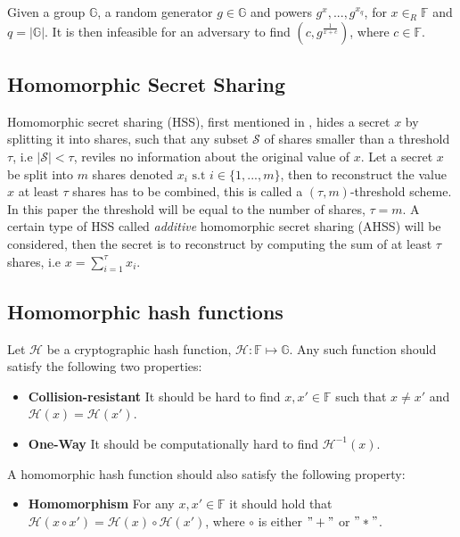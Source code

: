 \vspace{10pt}
\begin{Ass}
 Given a group $\mathds{G}$, a random generator $g\in \mathds{G}$ and powers $g^x,...,g^{x_q}$, for $x \in_R \mathds{F}$ and  $q= |\mathds{G}|$. It is then  infeasible for an adversary to find $(c, g^{\frac{1}{x+c}})$, where $c \in \mathds{F}$.
\end{Ass}




\subsection*{Homomorphic Secret Sharing}
Homomorphic secret sharing (HSS), first mentioned in \cite{How_share_A_secret}, hides a secret $x$ by splitting it into shares, such that any subset $\mathcal{S}$ of shares smaller than a threshold $\tau$, i.e $|\mathcal{S}|<\tau$, reviles no information about the original value of $x$.  Let a secret $x$ be split into $m$ shares denoted $x_i \text{ s.t } i\in\{1,...,m\}$, then to reconstruct the value $x$ at least $\tau$ shares has to be combined, this is called a $(\tau,m)$-threshold scheme. In this paper the threshold will be equal to the number of shares,  $\tau=m$. A certain type of HSS called \textit{additive} homomorphic secret sharing (AHSS) will be considered, then the secret  is to reconstruct by computing the sum of at least $\tau$ shares, i.e $x = \sum_{i=1}^\tau x_i$.

\subsection*{Homomorphic hash functions}
Let $\mathcal{H}$ be a cryptographic hash function, $\mathcal{H}:\mathds{F}\mapsto \mathds{G}$. Any such function should satisfy the following two properties:
\begin{itemize}
    \item \textbf{Collision-resistant} It should be hard to find $x,x'\in\mathds{F}$ such that $x\neq x'$ and $\mathcal{H}(x)=\mathcal{H}(x')$.
    \item \textbf{One-Way} It should be computationally hard to find $\mathcal{H}^{-1}(x)$.
\end{itemize}

A homomorphic hash function should also satisfy the following property:
\begin{itemize}
    \item \textbf{Homomorphism} For any $x,x'\in\mathds{F}$ it should hold that $\mathcal{H}(x\circ x') = \mathcal{H}(x)\circ\mathcal{H}(x')$, where $\circ$ is either $"+"$ or $"*"$.
\end{itemize}

